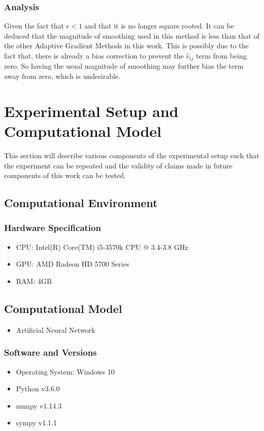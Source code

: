 \documentclass{article}
\begin{document}
\subsubsection{Analysis}
Given the fact that $\epsilon < 1$ and that it is no longer square rooted. It can be deduced that the magnitude of smoothing used in this method is less than that of the other Adaptive Gradient Methods in this work. This is possibly due to the fact that, there is already a bias correction to prevent the $\hat{v}_{ij}$ term from being zero. So having the usual magnitude of smoothing may further bias the term away from zero, which is undesirable.

\section{Experimental Setup and Computational Model}

This section will describe various components of the experimental setup such that the experiment can be repeated and the validity of claims made in future components of this work can be tested.

\subsection{Computational Environment}
\subsubsection{Hardware Specification}
\begin{itemize}
	\item  CPU: Intel(R) Core(TM) i5-3570k CPU @ 3.4-3.8 GHz
	\item  GPU: AMD Radeon HD 5700 Series
	\item  RAM: 4GB
\end{itemize}
\subsection{Computational Model}
\begin{itemize}
	\item Artificial Neural Network
	
\end{itemize}
\subsubsection{Software and Versions}
\begin{itemize}
	\item Operating System: Windows 10
	\item Python v3.6.0
	\item numpy v1.14.3
	\item sympy v1.1.1
\end{itemize}
\end{document}
